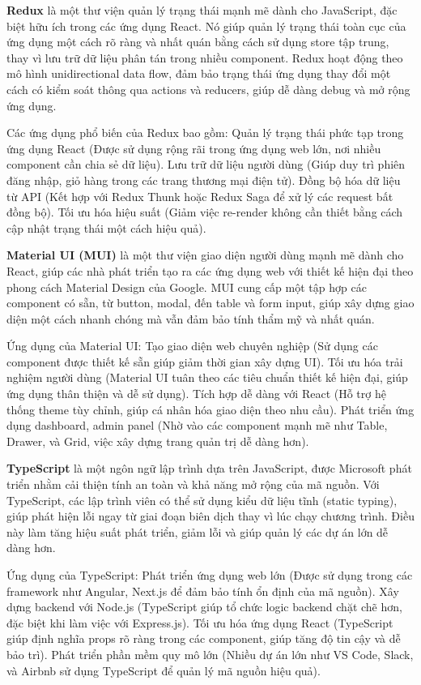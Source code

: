 \documentclass[a4paper]{article}
\begin{document}
\textbf{Redux} là một thư viện quản lý trạng thái mạnh mẽ dành cho JavaScript, đặc biệt hữu ích trong các ứng dụng React. Nó giúp quản lý trạng thái toàn cục của ứng dụng một cách rõ ràng và nhất quán bằng cách sử dụng store tập trung, thay vì lưu trữ dữ liệu phân tán trong nhiều component. Redux hoạt động theo mô hình unidirectional data flow, đảm bảo trạng thái ứng dụng thay đổi một cách có kiểm soát thông qua actions và reducers, giúp dễ dàng debug và mở rộng ứng dụng.

Các ứng dụng phổ biến của Redux bao gồm:
Quản lý trạng thái phức tạp trong ứng dụng React (Được sử dụng rộng rãi trong ứng dụng web lớn, nơi nhiều component cần chia sẻ dữ liệu).
Lưu trữ dữ liệu người dùng (Giúp duy trì phiên đăng nhập, giỏ hàng trong các trang thương mại điện tử).
Đồng bộ hóa dữ liệu từ API (Kết hợp với Redux Thunk hoặc Redux Saga để xử lý các request bất đồng bộ).
Tối ưu hóa hiệu suất (Giảm việc re-render không cần thiết bằng cách cập nhật trạng thái một cách hiệu quả).

\textbf{Material UI (MUI)} là một thư viện giao diện người dùng mạnh mẽ dành cho React, giúp các nhà phát triển tạo ra các ứng dụng web với thiết kế hiện đại theo phong cách Material Design của Google. MUI cung cấp một tập hợp các component có sẵn, từ button, modal, đến table và form input, giúp xây dựng giao diện một cách nhanh chóng mà vẫn đảm bảo tính thẩm mỹ và nhất quán.

Ứng dụng của Material UI:
Tạo giao diện web chuyên nghiệp (Sử dụng các component được thiết kế sẵn giúp giảm thời gian xây dựng UI).
Tối ưu hóa trải nghiệm người dùng (Material UI tuân theo các tiêu chuẩn thiết kế hiện đại, giúp ứng dụng thân thiện và dễ sử dụng).
Tích hợp dễ dàng với React (Hỗ trợ hệ thống theme tùy chỉnh, giúp cá nhân hóa giao diện theo nhu cầu).
Phát triển ứng dụng dashboard, admin panel (Nhờ vào các component mạnh mẽ như Table, Drawer, và Grid, việc xây dựng trang quản trị dễ dàng hơn).

\textbf{TypeScript} là một ngôn ngữ lập trình dựa trên JavaScript, được Microsoft phát triển nhằm cải thiện tính an toàn và khả năng mở rộng của mã nguồn. Với TypeScript, các lập trình viên có thể sử dụng kiểu dữ liệu tĩnh (static typing), giúp phát hiện lỗi ngay từ giai đoạn biên dịch thay vì lúc chạy chương trình. Điều này làm tăng hiệu suất phát triển, giảm lỗi và giúp quản lý các dự án lớn dễ dàng hơn.

Ứng dụng của TypeScript:
Phát triển ứng dụng web lớn (Được sử dụng trong các framework như Angular, Next.js  để đảm bảo tính ổn định của mã nguồn).
Xây dựng backend với Node.js (TypeScript giúp tổ chức logic backend chặt chẽ hơn, đặc biệt khi làm việc với Express.js).
Tối ưu hóa ứng dụng React (TypeScript giúp định nghĩa props rõ ràng trong các component, giúp tăng độ tin cậy và dễ bảo trì).
Phát triển phần mềm quy mô lớn (Nhiều dự án lớn như VS Code, Slack, và Airbnb sử dụng TypeScript để quản lý mã nguồn hiệu quả).
\end{document}
